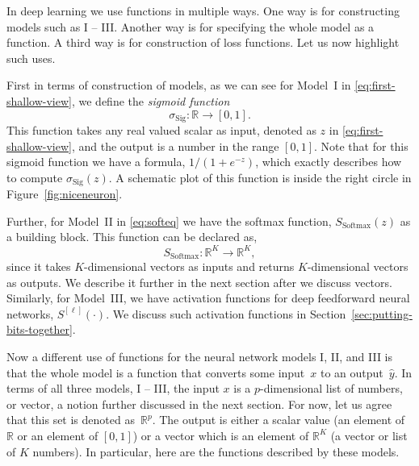 \documentclass[12pt]{article}
\begin{document}
In deep learning we use functions in multiple ways. One way is for constructing models such as I -- III. Another way is for specifying the whole model as a function. A third way is for construction of loss functions. Let us now highlight such uses.

First in terms of construction of models, as we can see for Model~I in \eqref{eq:first-shallow-view},  we define the {\em sigmoid function} 
%
\begin{equation}
\label{eq:sig-as-func}
\sigma_{\text{Sig}}: {\mathbb R} \to [0,1].
\end{equation}
%
This function takes any real valued scalar as input, denoted as $z$ in \eqref{eq:first-shallow-view}, and the output is a number in the range $[0,1]$. Note that for this sigmoid function we have a formula, $1/(1+e^{-z})$, which exactly describes how to compute $\sigma_{\text{Sig}}(z)$. A schematic plot of this function is inside the right circle in Figure~\ref{fig:niceneuron}.


Further, for Model~II in \eqref{eq:softeq} we have the softmax function, $S_{\textrm{Softmax}}(z)$ as a building block. This function can be declared as,
%
\begin{equation}
\label{eq:softmax-as-func}
S_{\textrm{Softmax}}: {\mathbb R}^K \to {\mathbb R}^K,
\end{equation}
%
since it takes $K$-dimensional vectors as inputs and returns $K$-dimensional vectors as outputs. We describe it further in the next section after we discuss vectors. Similarly, for Model~III, we have activation functions for deep feedforward neural networks, $S^{[\ell]}(\cdot)$. We discuss such activation functions in Section~\ref{sec:putting-bits-together}. 

Now a different use of functions for the neural network models I, II, and III is that the whole model is a function that converts some input~$x$ to an output~$\hat{y}$. In terms of all three models, I -- III, the input $x$ is a $p$-dimensional list of numbers, or vector, a notion further discussed in the next section. For now, let us agree that this set is denoted as~${\mathbb R}^p$. The output is either a scalar value (an element of ${\mathbb R}$ or an element of $[0,1]$) or a vector which is an element of ${\mathbb R}^K$ (a vector or list of $K$ numbers). In particular, here are the functions described by these models.
\end{document}
